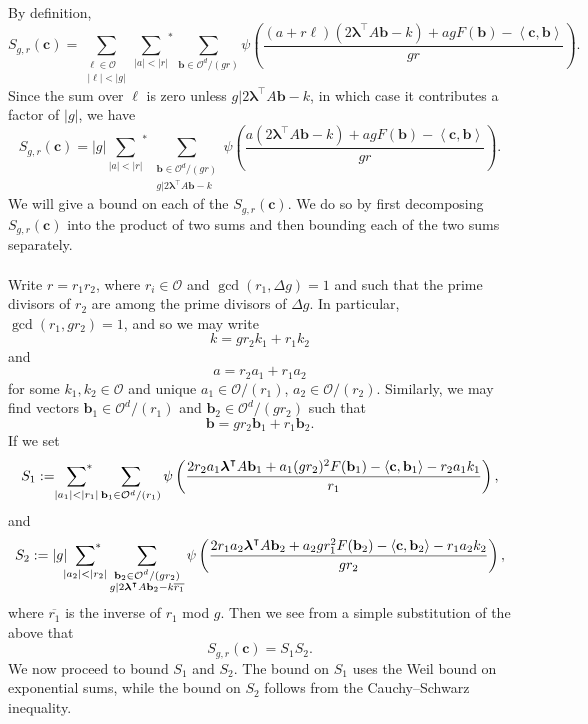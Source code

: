 \documentclass[10pt]{amsart}
\theoremstyle{plain}
\theoremstyle{plain}
\renewcommand{\vec}[1]{\mathbf{#1}}
\theoremstyle{remark}
\theoremstyle{definition}
\newcommand{\sumstar}{\sideset{}{^*}\sum}
\newcommand{\cO}{\mathcal{O}}
\begin{document}
By definition,
\[S_{g,r}(\vec{c})=\sum_{\substack{\ell\in \cO\\ |\ell|<|g|}}{\sum_{|a|<|r|}}^*\sum_{\vec{b}\in \mathcal{O}^d/(gr)} \psi\left(\frac{(a+r\ell)(2\boldsymbol{\lambda}^{\intercal} A\vec{b}-k) + ag F(\vec{b})-\left< \vec{c},\vec{b} \right>} {gr}\right).\]
Since the sum over $\ell$ is zero unless $g|2\boldsymbol{\lambda}^{\intercal}A\vec{b}-k$, in which case it contributes a factor of $|g|$, we have
\[S_{g,r}(\vec{c})=|g|{\sum_{|a|<|r|}}^*\sum_{\substack{\vec{b}\in \mathcal{O}^d/(gr)\\ g|2\boldsymbol{\lambda}^{\intercal}A\vec{b}-k}} \psi\left(\frac{a(2\boldsymbol{\lambda}^{\intercal} A\vec{b}-k) + ag F(\vec{b})-\left< \vec{c},\vec{b} \right>} {gr}\right).\]
We will give a bound on each of the $S_{g,r}(\vec{c})$. We do so by first decomposing $S_{g,r}(\vec{c})$ into the product of two sums and then bounding each of the two sums separately.\\
\\
Write $r=r_1r_2$, where $r_i\in\mathcal{O}$ and $\gcd(r_1,\Delta g)=1$ and such that the prime divisors of $r_2$ are among the prime divisors of $\Delta g$. In particular, $\gcd(r_1,gr_2)=1$, and so we may write
\[k=gr_2k_1+r_1k_2\]
and
\[a=r_2a_1+r_1a_2\]
for some $k_1,k_2\in\mathcal{O}$ and unique $a_1\in\mathcal{O}/(r_1)$, $a_2\in\mathcal{O}/(r_2)$. Similarly, we may find vectors $\vec{b}_1\in\mathcal{O}^d/(r_1)$ and $\vec{b}_2\in\mathcal{O}^d/(gr_2)$ such that
\[\vec{b}=gr_2\vec{b}_1+r_1\vec{b}_2.\]
If we set
\begin{equation}\label{S1}
S_1:=\sumstar_{|a_1|<|r_1|}\sum_{\vec{b}_1\in \mathcal{O}^d/(r_1)} \psi\left(\frac{2r_2a_1\boldsymbol{\lambda}^{\intercal}A\vec{b}_1+a_1(gr_2)^2F(\vec{b}_1)-\left<\vec{c},\vec{b}_1\right>-r_2a_1k_1    }{r_1}\right),
\end{equation}
and 
\begin{equation}\label{S2}
S_2:=|g|\sumstar_{|a_2|<|r_2|}\sum_{\substack{\vec{b}_2\in \mathcal{O}^d/(gr_2)\\ g|2\boldsymbol{\lambda}^{\intercal}A\vec{b}_2-k\overline{r_1}}}  \psi\left(\frac{2r_1a_2\boldsymbol{\lambda}^{\intercal}A\vec{b}_2+a_2gr_1^2F(\vec{b}_2)-\left<\vec{c},\vec{b}_2\right>-r_1a_2k_2}{gr_2}\right),
\end{equation}
where $\overline{r_1}$ is the inverse of $r_1$ mod $g.$ Then we see from a simple substitution of the above that
\[S_{g,r}(\vec{c})=S_1S_2.\]
We now proceed to bound $S_1$ and $S_2$. The bound on $S_1$ uses the Weil bound on exponential sums, while the bound on $S_2$ follows from the Cauchy--Schwarz inequality.\\
\end{document}
